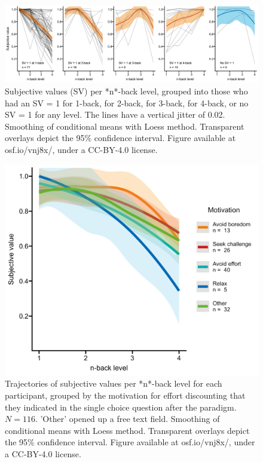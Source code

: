 \documentclass[
  man,floatsintext]{apa6}
\begin{document}
\begin{figure}[H]
\includegraphics[width=\textwidth]{Figures/sv_by_pref} \caption{Subjective values (SV) per *n*-back level, grouped into those who had an SV = 1 for 1-back, for 2-back, for 3-back, for 4-back, or no SV = 1 for any level. The lines have a vertical jitter of 0.02. Smoothing of conditional means with Loess method. Transparent overlays depict the 95\% confidence interval. Figure available at osf.io/vnj8x/, under a CC-BY-4.0 license.}\label{fig:sv-by-pref}
\end{figure}

\begin{figure}[H]
\includegraphics[width=\textwidth]{Figures/motivation} \caption{Trajectories of subjective values per *n*-back level for each participant, grouped by the motivation for effort discounting that they indicated in the single choice question after the paradigm. $N=116$. 'Other' opened up a free text field. Smoothing of conditional means with Loess method. Transparent overlays depict the 95\% confidence interval. Figure available at osf.io/vnj8x/, under a CC-BY-4.0 license.}\label{fig:motivation}
\end{figure}
\end{document}
